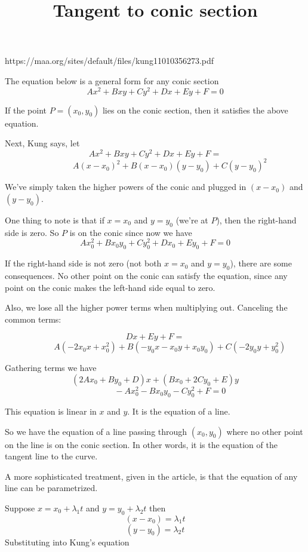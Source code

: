 \documentclass[11pt, oneside]{article}
\title{Tangent to conic section}
\date{}
\begin{document}
\maketitle
\Large



{https://maa.org/sites/default/files/kung11010356273.pdf}

The equation below is a general form for any conic section
\[ Ax^2 + Bxy + Cy^2 + Dx + Ey + F = 0 \]

If the point $P = (x_0,y_0)$ lies on the conic section, then it satisfies the above equation.

Next, Kung says, let
\[ Ax^2 + Bxy + Cy^2 + Dx + Ey + F = \]
\[ \ \ \ \ \ \ \ \  \ \ \ \ \ \ \ \ A(x-x_0)^2 + B(x-x_0)(y - y_0) + C(y-y_0)^2 \]

We've simply taken the higher powers of the conic and plugged in $(x - x_0)$ and $(y - y_0)$.

One thing to note is that if $x = x_0$ and $y = y_0$ (we're at $P$), then the right-hand side is zero.  So $P$ is on the conic since now we have
\[ Ax_0^2 + Bx_0y_0 + Cy_0^2 + Dx_0 + Ey_0 + F = 0 \]

If the right-hand side is not zero (not both $x = x_0$ and $y = y_0$), there are some consequences.  No other point on the conic can satisfy the equation, since any point on the conic makes the left-hand side equal to zero.

Also, we lose all the higher power terms when multiplying out.  Canceling the common terms: 

\[ Dx + Ey + F = \]
\[ \ \ \ \ \ \ \ \  \ \ \ \ \ \ \ \ A(-2x_0 x + x_0^2) + B(-y_0 x - x_0 y + x_0y_0) + C(-2y_0 y + y_0^2) \]

Gathering terms we have
\[ (2Ax_0 + By_0 + D)x  + (B x_0 + 2Cy_0 + E) y \]
\[  \ \ \ \ \ \ \ \ \ \ \ \ \ \ \ \ - Ax_0^2 - B x_0 y_0 - C y_0^2 + F = 0    \]

This equation is linear in $x$ and $y$.  It is the equation of a line.

So we have the equation of a line passing through $(x_0,y_0)$ where no other point on the line is on the conic section.  In other words, it is the equation of the tangent line to the curve.

A more sophisticated treatment, given in the article, is that the equation of any line can be parametrized.

Suppose $x = x_0 + \lambda_1 t$ and $y = y_0 + \lambda_2 t$ then
\[ (x - x_0) = \lambda_1 t \]
\[ (y - y_0) = \lambda_2 t \]
Substituting into Kung's equation
\end{document}
